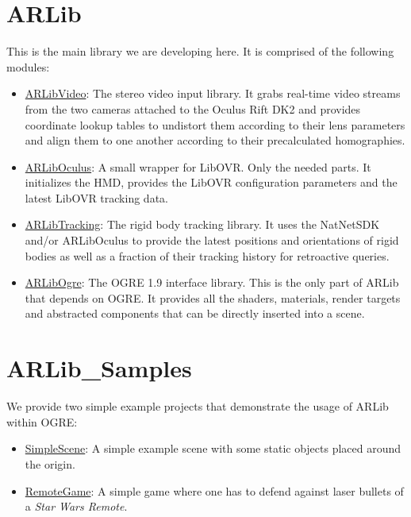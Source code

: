 \section{ARLib}\label{arlib}

This is the main library we are developing here. It is comprised of the
following modules:

\begin{itemize}
\item
  \hyperref[sec:video_library]{ARLibVideo}:
  The stereo video input library. It grabs real-time video streams from
  the two cameras\cite{c310} attached to the Oculus Rift DK2\cite{dk2} and provides
  coordinate lookup tables to undistort them according to their lens
  parameters and align them to one another according to their
  precalculated homographies.
\item
  \hyperref[sec:oculus_library]{ARLibOculus}:
  A small wrapper for LibOVR\cite{dk2}. Only the needed parts. It initializes the
  HMD, provides the LibOVR configuration parameters and the latest
  LibOVR tracking data.
\item
  \hyperref[sec:tracking_library]{ARLibTracking}:
  The rigid body tracking library. It uses the NatNetSDK\cite{optitrack} and/or
  ARLibOculus to provide the latest positions and orientations of rigid
  bodies as well as a fraction of their tracking history for retroactive
  queries.
\item
  \hyperref[sec:ogre_library]{ARLibOgre}:
  The OGRE 1.9\cite{ogre} interface library. This is the only part of ARLib that depends on
  OGRE. It provides all the shaders, materials, render targets and
  abstracted components that can be directly inserted into a scene.
\end{itemize}

\section{ARLib\_Samples}\label{arlibux5fsamples}

We provide two simple example projects that demonstrate the usage of
ARLib within OGRE:

\begin{itemize}
\item
  \hyperref[sec:simple_scene]{SimpleScene}:
  A simple example scene with some static objects placed around the
  origin.
\item
  \hyperref[sec:remote_game]{RemoteGame}:
  A simple game where one has to defend against laser bullets of a \emph{Star
  Wars Remote}.
\end{itemize}